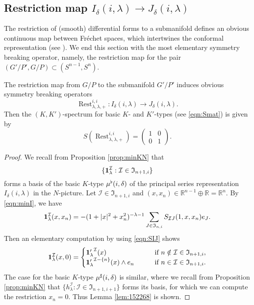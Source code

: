 \subsection{Restriction map $I_{\delta}(i,\lambda) \to J_{\delta}(i,\lambda)$}
\label{subsec:Rest}
The restriction of (smooth) differential forms
 to a submanifold defines an obvious continuous map
 between Fr{\'e}chet spaces,
 which intertwines the conformal representation
 (see \cite[Lem.~8.9]{KKP}).  
We end this section with the most elementary symmetry breaking operator,
 namely,
 the restriction map
 for the pair $(G'/P', G/P) \subset (S^{n-1},S^n)$.  
\begin{lemma}
\label{lem:152268}
The restriction map from $G/P$ to the submanifold $G'/P'$
 induces obvious symmetry breaking operators
\[
{\operatorname{Rest}}_{\lambda,\lambda,+}^{i,i}
:
I_{\delta}(i,\lambda) \to J_{\delta}(i,\lambda).  
\]
Then the $(K,K')$-spectrum
 for basic $K$- and $K'$-types (see \eqref{eqn:Smat})
 is given by
\begin{equation}
\label{eqn:SRest}
  S({\operatorname{Rest}}_{\lambda,\lambda,+}^{i,i})
  =
  \begin{pmatrix} 1 & 0 \\ 0 & 1\end{pmatrix}.
\end{equation}
\end{lemma}
\begin{proof}
We recall from Proposition \ref{prop:minKN}
 that 
\[
   \{ {\bf{1}}_{\lambda}^{\mathcal{I}}
    :
   {\mathcal{I}} \in {\mathfrak {I}}_{n+1,i}
   \}
\]
forms a basis of the basic $K$-type $\mub(i,\delta)$
 of the principal series representation $I_{\delta}(i,\lambda)$
 in the $N$-picture.  
Let $\mathcal{I} \in {\mathfrak {I}}_{n+1,i}$
 and $(x,x_n) \in {\mathbb{R}}^{n-1} \oplus {\mathbb{R}}={\mathbb{R}}^n$.  
By \eqref{eqn:minI}, 
 we have
\[
{\bf{1}}_{\lambda}^{\mathcal{I}}(x,x_n)
=-(1+|x|^2+x_n^2)^{-\lambda-1}
\sum_{J \in {\mathfrak{I}}_{n,i}} S_{{\mathcal{I}}J}(1,x,x_n)e_J.  
\]
Then an elementary computation by using \eqref{eqn:SIJ} shows
\begin{equation*}
{\bf{1}}_{\lambda}^{\mathcal{I}}(x,0)
=
\begin{cases}
{{\bf{1}}_{\lambda}'}^{\mathcal{I}}(x)
\qquad
&\text{if }n \notin {\mathcal{I}} \in {\mathfrak {I}}_{n+1,i}, 
\\
{{\bf{1}}_{\lambda}'}^{\mathcal{I}\setminus \{n\}}(x) \wedge e_n
\qquad
&\text{if }n \in {\mathcal{I}} \in {\mathfrak {I}}_{n+1,i}.  
\end{cases}
\end{equation*}
The case for the basic $K$-type
 $\mus(i,\delta)$ is similar, 
 where we recall from Proposition \ref{prop:minKN}
 that $\{h_{\lambda}^{\mathcal{I}}: {\mathcal{I}} \in {\mathfrak {I}}_{n+1,i+1}\}$ forms its basis, 
 for which we can compute the restriction $x_n=0$.  
Thus Lemma \ref{lem:152268} is shown.  
\end{proof}

